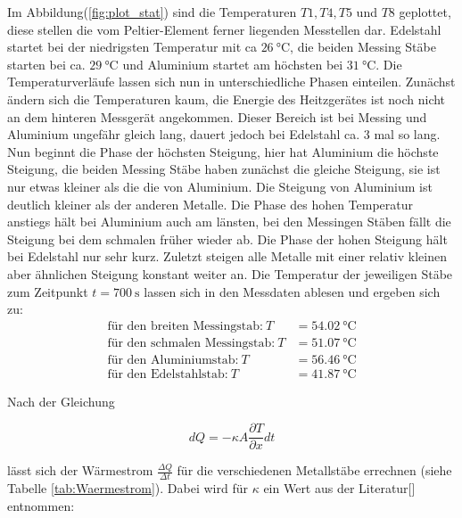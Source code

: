       \noindent Im Abbildung(\ref{fig:plot_stat}) sind die Temperaturen $T1, T4, T5$ und $T8$ geplottet, diese stellen die vom Peltier-Element ferner 
      liegenden Messtellen dar. Edelstahl startet bei der niedrigsten Temperatur mit ca $\SI{26}{\celsius}$, die beiden Messing Stäbe starten 
      bei ca. $\SI{29}{\celsius}$ und Aluminium startet am höchsten bei $\SI{31}{\celsius}$. Die Temperaturverläufe 
      lassen sich nun in unterschiedliche Phasen einteilen. Zunächst ändern sich die Temperaturen kaum, die Energie des 
      Heitzgerätes ist noch nicht an dem hinteren Messgerät angekommen. Dieser Bereich ist bei Messing und 
      Aluminium ungefähr gleich lang, dauert jedoch bei Edelstahl ca. 3 mal so lang. Nun beginnt die Phase der 
      höchsten Steigung, hier hat Aluminium die höchste Steigung, die beiden Messing Stäbe haben zunächst die 
      gleiche Steigung, sie ist nur etwas kleiner als die die von Aluminium. Die Steigung von Aluminium ist 
      deutlich kleiner als der anderen Metalle. Die Phase des hohen Temperatur anstiegs hält bei Aluminium auch am länsten,
      bei den Messingen Stäben fällt die Steigung bei dem schmalen früher wieder ab. Die Phase der hohen Steigung 
      hält bei Edelstahl nur sehr kurz. Zuletzt steigen alle Metalle mit einer relativ kleinen aber ähnlichen Steigung konstant 
      weiter an.
      Die Temperatur der jeweiligen Stäbe zum Zeitpunkt $t=\SI{700}{\second}$ lassen sich in den Messdaten ablesen und ergeben sich zu:
      \begin{align}
        \text{für den breiten Messingstab:} \: T&= \SI{54.02}{\celsius}\\ \label{eqn:M1}
        \text{für den schmalen Messingstab:} \: T&= \SI{51.07}{\celsius}\\ 
        \text{für den Aluminiumstab:} \: T&= \SI{56.46}{\celsius}\\ 
        \text{für den Edelstahlstab:} \: T&= \SI{41.87}{\celsius} \label{eqn:E1}
      \end{align}
    
      \noindent Nach der Gleichung  
      
      \begin{equation}\label{eqn:Wärmemenge}
        dQ = -\kappa A \frac{\partial T}{\partial x}dt 
      \end{equation}
      
      \noindent lässt sich der Wärmestrom $\frac{\Delta Q}{\Delta t}$ für die verschiedenen Metallstäbe 
      errechnen (siehe Tabelle \ref{tab:Waermestrom}).
      Dabei wird für $\kappa $ ein Wert aus der Literatur[\cite{leit}] entnommen:

